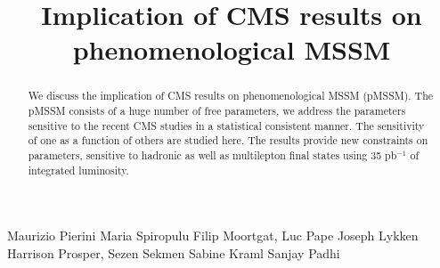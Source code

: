 \documentclass{cmspaper}
\begin{document}
%
\begin{titlepage}
\title{Implication of CMS results on phenomenological MSSM}

  \begin{Authlist}
    Maurizio Pierini
    Maria Spiropulu
    Filip Moortgat, Luc Pape
    Joseph Lykken
    Harrison Prosper, Sezen Sekmen
    Sabine Kraml
    Sanjay Padhi
    
  \end{Authlist}

\begin{abstract}
We discuss the implication of CMS results on phenomenological MSSM (pMSSM). The pMSSM
consists of a huge number of free parameters, we address the parameters sensitive 
to the recent CMS studies in a statistical consistent manner. The sensitivity of one as a function 
of others are studied here. The results provide new constraints on parameters, sensitive to hadronic as well as 
multilepton final states using 35 pb$^{-1}$ of integrated luminosity.
\end{abstract}
\end{titlepage}










\clearpage

\end{document}
